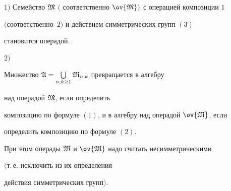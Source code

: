 \begin{thm}


$1)$ Семейство ${\frak M}$ $($ соответственно $\ov{\M})$ с операцией композиции $1$


$($соот\-вет\-ст\-вен\-но~$2)$ и действием симметрических групп $(3)$


становится операдой.





$2)$


Множество ${\frak A}=\bigcup \limits_{n,k\geq 1} {\frak M}_{n,k}$ превращается в алгебру 


над операдой ${\frak M}$, если определить


композицию по формуле $(1)$, и в алгебру над операдой $\ov{\frak M}$, если 


определить композицию по формуле $(2)$.


При этом операды ${\frak M}$ и $\ov{\M}$ надо считать несимметрическими 


$($т.\,е. исключить из их определения 


действия симметрических групп$)$.


\end{thm}





